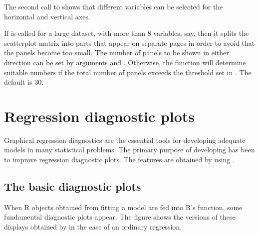 \documentclass[11pt]{article}\usepackage[]{graphicx}\usepackage[]{color}
\begin{document}
The second call to  shows that different variables can be
selected for the horizontal and vertical axes. 

If  is called for a large dataset, with more than 8 variables, 
say, then it splits the scatterplot matrix into parts that appear on
separate pages in order to avoid that the panels become too small.
The number of panels to be shown in either direction can be set by 
arguments  and . 
Otherwise, the function will determine suitable numbers 
if the total number of panels exceeds the threshold set in 
. The default is 30.


\section{Regression diagnostic plots}
Graphical regression diagnostics are the essential tools for developing
adequate models in many statistical problems.
The primary purpose of developing  has been to improve
regression diagnostic plots.
The features are obtained by using .

\subsection{The basic diagnostic plots}
When R objects obtained from fitting a model are fed into R's 
function, some fundamental diagnostic plots appear. 
The figure shows the versions of these displays obtained by 
in the case of an ordinary regression.
\end{document}
